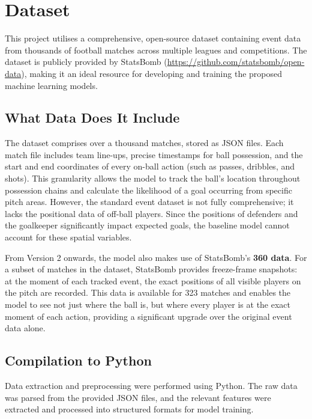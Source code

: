 \documentclass{article}
\begin{document}
\section{Dataset}\label{sec:dataset}

This project utilises a comprehensive, open-source dataset containing event data from thousands of football matches across multiple leagues and competitions. The dataset is publicly provided by StatsBomb (\url{https://github.com/statsbomb/open-data}), making it an ideal resource for developing and training the proposed machine learning models.

\subsection{What Data Does It Include}

The dataset comprises over a thousand matches, stored as JSON files. Each match file includes team line-ups, precise timestamps for ball possession, and the start and end coordinates of every on-ball action (such as passes, dribbles, and shots). This granularity allows the model to track the ball's location throughout possession chains and calculate the likelihood of a goal occurring from specific pitch areas. However, the standard event dataset is not fully comprehensive; it lacks the positional data of off-ball players. Since the positions of defenders and the goalkeeper significantly impact expected goals, the baseline model cannot account for these spatial variables.

From Version 2 onwards, the model also makes use of StatsBomb's \textbf{360 data}. For a subset of matches in the dataset, StatsBomb provides freeze-frame snapshots: at the moment of each tracked event, the exact positions of all visible players on the pitch are recorded. This data is available for 323 matches and enables the model to see not just where the ball is, but where every player is at the exact moment of each action, providing a significant upgrade over the original event data alone.

\subsection{Compilation to Python}

Data extraction and preprocessing were performed using Python. The raw data was parsed from the provided JSON files, and the relevant features were extracted and processed into structured formats for model training.
\end{document}
